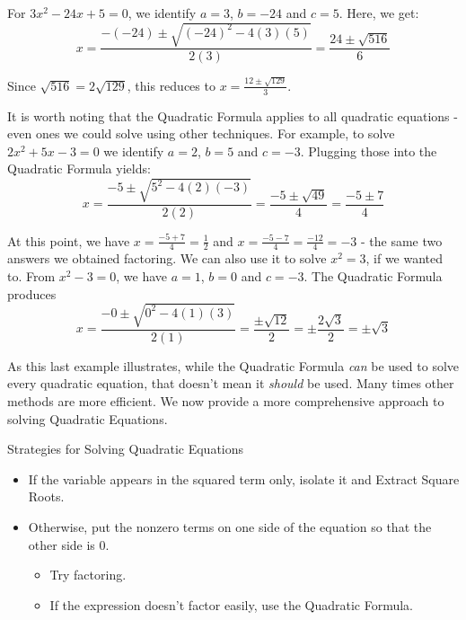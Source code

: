 For $3x^2 - 24x + 5 = 0$, we identify $a = 3$, $b = -24$ and $c = 5$.  Here, we get: \[ x = \dfrac{-(-24) \pm \sqrt{(-24)^2 - 4(3)(5)}}{2(3)} = \dfrac{24 \pm \sqrt{516}}{6} \]

Since $\sqrt{516} = 2\sqrt{129}$, this reduces to  $x = \frac{12 \pm \sqrt{129}}{3}$. 

It is worth noting that the Quadratic Formula applies to all quadratic equations - even ones we could solve using other techniques.  For example, to solve $2x^2 + 5x - 3 = 0$  we identify $a = 2$, $b = 5$ and $c = -3$.  Plugging those into the Quadratic Formula yields: \[ x = \dfrac{-5 \pm \sqrt{5^2 - 4(2)(-3)}}{2(2)} = \dfrac{-5 \pm \sqrt{49}}{4} = \dfrac{-5 \pm 7}{4} \]

At this point, we have $x = \frac{-5+7}{4} = \frac{1}{2}$ and $x = \frac{-5-7}{4} = \frac{-12}{4} = -3$ - the same two answers we obtained factoring.  We can also use it to solve $x^2 = 3$, if we wanted to.  From $x^2 -3 = 0$, we have $a = 1$, $b = 0$ and $c = -3$.  The Quadratic Formula produces \[ x = \dfrac{-0 \pm \sqrt{0^2 - 4(1)(3)}}{2(1)} = \dfrac{\pm\sqrt{12}}{2} = \pm \dfrac{2\sqrt{3}}{2} = \pm \sqrt{3}\]

As this last example illustrates, while the  Quadratic Formula \textit{can} be used to solve every quadratic equation, that doesn't mean it \textit{should} be used.  Many times other methods are more efficient.  We now provide a more comprehensive approach to solving Quadratic Equations.  

\begin{floatbox}[label=box:solvequadraticeqns]{Strategies for Solving Quadratic Equations}

\begin{itemize}[leftmargin=*]

\item  If the variable appears in the squared term only, isolate it and Extract Square Roots.
\item  Otherwise, put the nonzero terms on one side of the equation so that the other side is $0$.
\begin{itemize}
\item  Try factoring.  
\item  If the expression doesn't factor easily, use the Quadratic Formula.

\end{itemize}
\end{itemize}

\end{floatbox}

